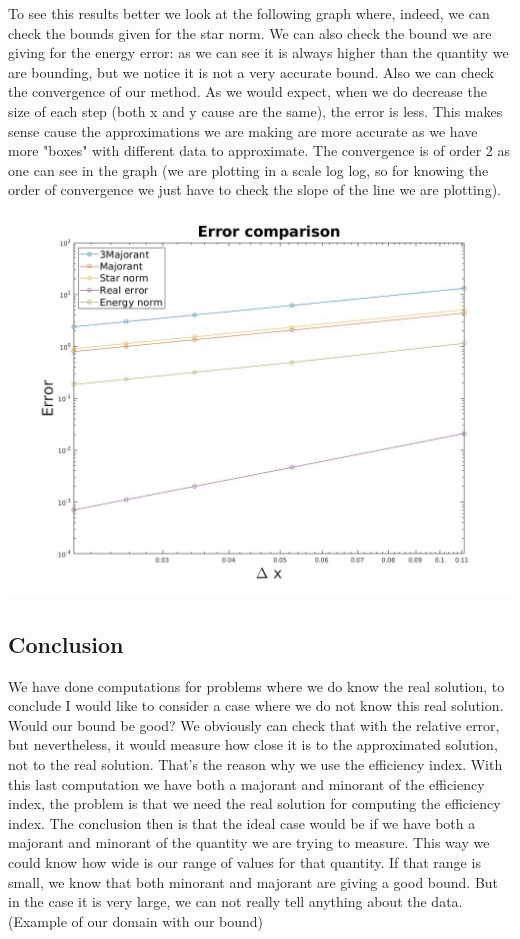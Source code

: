 \documentclass{article}
\begin{document}
	To see this results better we look at the following graph where, indeed, we can check the bounds given for the star norm. We can also check the bound we are giving for the energy error: as we can see it is always higher than the quantity we are bounding, but we notice it is not a very accurate bound.
	Also we can check the convergence of our method. As we would expect, when we do decrease the size of each step (both x and y cause are the same), the error is less. This makes sense cause the approximations we are making are more accurate as we have more "boxes" with different data to approximate. The convergence is of order 2 as one can see in the graph (we are plotting in a scale log log, so for knowing the order of convergence we just have to check the slope of the line we are plotting). 
	\begin{center}
		\includegraphics[width = 0.7\linewidth]{../Images/errorcomparison2d.jpg}
	\end{center}
	
	
	
	\subsection*{Conclusion}
	We have done computations for problems where we do know the real solution, to conclude I would like to consider a case where we do not know this real solution. Would our bound be good? We obviously can check that with the relative error, but nevertheless, it would measure how close it is to the approximated solution, not to the real solution. That's the reason why we use the efficiency index. With this last computation we have both a majorant and minorant of the efficiency index, the problem is that we need the real solution for computing the efficiency index. The conclusion then is that the ideal case would be if we have both a majorant and minorant of the quantity we are trying to measure. This way we could know how wide is our range of values for that quantity. If that range is small, we know that both minorant and majorant are giving a good bound. But in the case it is very large, we can not really tell anything about the data. (Example of our domain with our bound)
	
	
\end{document}
